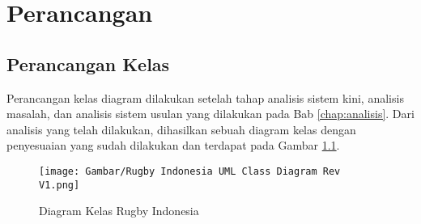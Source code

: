\chapter{Perancangan}
\label{chap:perancangan}

\section{Perancangan Kelas}
Perancangan kelas diagram dilakukan setelah tahap analisis sistem kini, analisis masalah, dan analisis sistem usulan yang dilakukan pada Bab \ref{chap:analisis}. Dari analisis yang telah dilakukan, dihasilkan sebuah diagram kelas dengan penyesuaian yang sudah dilakukan dan terdapat pada Gambar \ref{fig:rugby-indonesia-class-diagram}.

\begin{figure} [H]
    \centering
    \texttt{[image: Gambar/Rugby Indonesia UML Class Diagram Rev V1.png]}
    \caption{Diagram Kelas Rugby Indonesia}
    \label{fig:rugby-indonesia-class-diagram}
\end{figure}

